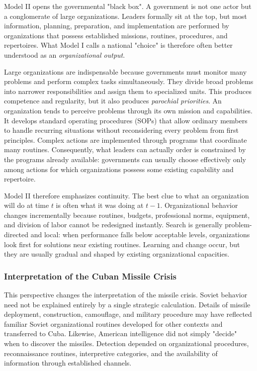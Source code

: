 Model II opens the governmental "black box". A government is not one actor but a conglomerate of large organizations. Leaders formally sit at the top, but most information, planning, preparation, and implementation are performed by organizations that possess established missions, routines, procedures, and repertoires. What Model I calls a national "choice" is therefore often better understood as an \emph{organizational output}.

Large organizations are indispensable because governments must monitor many problems and perform complex tasks simultaneously. They divide broad problems into narrower responsibilities and assign them to specialized units. This produces competence and regularity, but it also produces \emph{parochial priorities}. An organization tends to perceive problems through its own mission and capabilities. It develops standard operating procedures (SOPs) that allow ordinary members to handle recurring situations without reconsidering every problem from first principles. Complex actions are implemented through programs that coordinate many routines. Consequently, what leaders can actually order is constrained by the programs already available: governments can usually choose effectively only among actions for which organizations possess some existing capability and repertoire.

Model II therefore emphasizes continuity. The best clue to what an organization will do at time $t$ is often what it was doing at $t-1$. Organizational behavior changes incrementally because routines, budgets, professional norms, equipment, and division of labor cannot be redesigned instantly. Search is generally problem-directed and local: when performance falls below acceptable levels, organizations look first for solutions near existing routines. Learning and change occur, but they are usually gradual and shaped by existing organizational capacities.

\subsubsection{Interpretation of the Cuban Missile Crisis}
This perspective changes the interpretation of the missile crisis. Soviet behavior need not be explained entirely by a single strategic calculation. Details of missile deployment, construction, camouflage, and military procedure may have reflected familiar Soviet organizational routines developed for other contexts and transferred to Cuba. Likewise, American intelligence did not simply "decide" when to discover the missiles. Detection depended on organizational procedures, reconnaissance routines, interpretive categories, and the availability of information through established channels.

